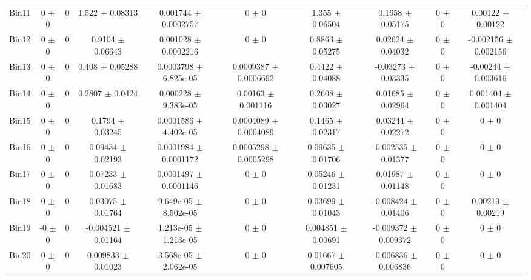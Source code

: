 \begin{tabular}{@{\extracolsep{4pt}}lccccccccc@{}}
     Bin11 & 0 $\pm$ 0 & 0 & 1.522 $\pm$ 0.08313 & 0.001744 $\pm$ 0.0002757 & 0 $\pm$ 0 & 1.355 $\pm$ 0.06504 & 0.1658 $\pm$ 0.05175 & 0 $\pm$ 0 & 0.00122 $\pm$ 0.00122 \\ 
     Bin12 & 0 $\pm$ 0 & 0 & 0.9104 $\pm$ 0.06643 & 0.001028 $\pm$ 0.0002216 & 0 $\pm$ 0 & 0.8863 $\pm$ 0.05275 & 0.02624 $\pm$ 0.04032 & 0 $\pm$ 0 & -0.002156 $\pm$ 0.002156 \\ 
     Bin13 & 0 $\pm$ 0 & 0 & 0.408 $\pm$ 0.05288 & 0.0003798 $\pm$ 6.825e-05 & 0.0009387 $\pm$ 0.0006692 & 0.4422 $\pm$ 0.04088 & -0.03273 $\pm$ 0.03335 & 0 $\pm$ 0 & -0.00244 $\pm$ 0.003616 \\ 
     Bin14 & 0 $\pm$ 0 & 0 & 0.2807 $\pm$ 0.0424 & 0.000228 $\pm$ 9.383e-05 & 0.00163 $\pm$ 0.001116 & 0.2608 $\pm$ 0.03027 & 0.01685 $\pm$ 0.02964 & 0 $\pm$ 0 & 0.001404 $\pm$ 0.001404 \\ 
     Bin15 & 0 $\pm$ 0 & 0 & 0.1794 $\pm$ 0.03245 & 0.0001586 $\pm$ 4.402e-05 & 0.0004089 $\pm$ 0.0004089 & 0.1465 $\pm$ 0.02317 & 0.03244 $\pm$ 0.02272 & 0 $\pm$ 0 & 0 $\pm$ 0 \\ 
     Bin16 & 0 $\pm$ 0 & 0 & 0.09434 $\pm$ 0.02193 & 0.0001984 $\pm$ 0.0001172 & 0.0005298 $\pm$ 0.0005298 & 0.09635 $\pm$ 0.01706 & -0.002535 $\pm$ 0.01377 & 0 $\pm$ 0 & 0 $\pm$ 0 \\ 
     Bin17 & 0 $\pm$ 0 & 0 & 0.07233 $\pm$ 0.01683 & 0.0001497 $\pm$ 0.0001146 & 0 $\pm$ 0 & 0.05246 $\pm$ 0.01231 & 0.01987 $\pm$ 0.01148 & 0 $\pm$ 0 & 0 $\pm$ 0 \\ 
     Bin18 & 0 $\pm$ 0 & 0 & 0.03075 $\pm$ 0.01764 & 9.649e-05 $\pm$ 8.502e-05 & 0 $\pm$ 0 & 0.03699 $\pm$ 0.01043 & -0.008424 $\pm$ 0.01406 & 0 $\pm$ 0 & 0.00219 $\pm$ 0.00219 \\ 
     Bin19 & -0 $\pm$ 0 & 0 & -0.004521 $\pm$ 0.01164 & 1.213e-05 $\pm$ 1.213e-05 & 0 $\pm$ 0 & 0.004851 $\pm$ 0.00691 & -0.009372 $\pm$ 0.009372 & 0 $\pm$ 0 & 0 $\pm$ 0 \\ 
     Bin20 & 0 $\pm$ 0 & 0 & 0.009833 $\pm$ 0.01023 & 3.568e-05 $\pm$ 2.062e-05 & 0 $\pm$ 0 & 0.01667 $\pm$ 0.007605 & -0.006836 $\pm$ 0.006836 & 0 $\pm$ 0 & 0 $\pm$ 0 \\ 
\hline\hline
  \end{tabular}
